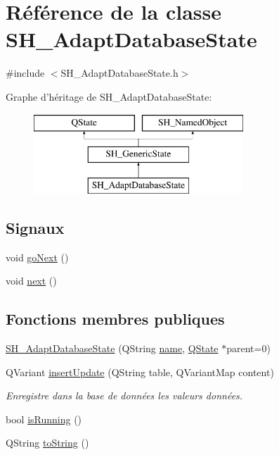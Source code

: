 \hypertarget{classSH__AdaptDatabaseState}{\section{Référence de la classe S\-H\-\_\-\-Adapt\-Database\-State}
\label{classSH__AdaptDatabaseState}
}


{\ttfamily \#include $<$S\-H\-\_\-\-Adapt\-Database\-State.\-h$>$}

Graphe d'héritage de S\-H\-\_\-\-Adapt\-Database\-State\-:\begin{figure}[H]
\begin{center}
\leavevmode
\includegraphics[height=3.000000cm]{classSH__AdaptDatabaseState}
\end{center}
\end{figure}
\subsection*{Signaux}
\begin{DoxyCompactItemize}
\item 
void \hyperlink{classSH__GenericState_a34c1bebc765cc3a62d66c94c37d4f0c3}{go\-Next} ()
\item 
void \hyperlink{classSH__GenericState_ad5e2a1f3dc129336c8f529cf897c2eb0}{next} ()
\end{DoxyCompactItemize}
\subsection*{Fonctions membres publiques}
\begin{DoxyCompactItemize}
\item 
\hyperlink{classSH__AdaptDatabaseState_aaca9bab6a7263320c40149987b82c024}{S\-H\-\_\-\-Adapt\-Database\-State} (Q\-String \hyperlink{classSH__NamedObject_a9f686c6f2a5bcc08ad03d0cee0151f0f}{name}, \hyperlink{classQState}{Q\-State} $\ast$parent=0)
\item 
Q\-Variant \hyperlink{classSH__AdaptDatabaseState_a037db544ea05f42d21fcbdda758839fe}{insert\-Update} (Q\-String table, Q\-Variant\-Map content)
\begin{DoxyCompactList}\small\item\em Enregistre dans la base de données les valeurs données. \end{DoxyCompactList}\item 
bool \hyperlink{classSH__GenericState_a5f731810dad0cacd28828ccbf1539e4e}{is\-Running} ()
\item 
Q\-String \hyperlink{classSH__GenericState_a7779babbb40f3f8faa71112204d9804f}{to\-String} ()
\end{DoxyCompactItemize}
